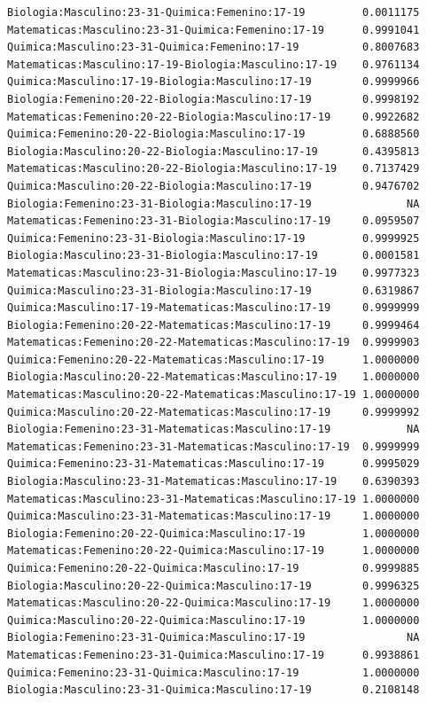 \documentclass{rapport}
\begin{document}
\begin{itemize}
\begin{verbatim}
Biologia:Masculino:23-31-Quimica:Femenino:17-19         0.0011175
Matematicas:Masculino:23-31-Quimica:Femenino:17-19      0.9991041
Quimica:Masculino:23-31-Quimica:Femenino:17-19          0.8007683
Matematicas:Masculino:17-19-Biologia:Masculino:17-19    0.9761134
Quimica:Masculino:17-19-Biologia:Masculino:17-19        0.9999966
Biologia:Femenino:20-22-Biologia:Masculino:17-19        0.9998192
Matematicas:Femenino:20-22-Biologia:Masculino:17-19     0.9922682
Quimica:Femenino:20-22-Biologia:Masculino:17-19         0.6888560
Biologia:Masculino:20-22-Biologia:Masculino:17-19       0.4395813
Matematicas:Masculino:20-22-Biologia:Masculino:17-19    0.7137429
Quimica:Masculino:20-22-Biologia:Masculino:17-19        0.9476702
Biologia:Femenino:23-31-Biologia:Masculino:17-19               NA
Matematicas:Femenino:23-31-Biologia:Masculino:17-19     0.0959507
Quimica:Femenino:23-31-Biologia:Masculino:17-19         0.9999925
Biologia:Masculino:23-31-Biologia:Masculino:17-19       0.0001581
Matematicas:Masculino:23-31-Biologia:Masculino:17-19    0.9977323
Quimica:Masculino:23-31-Biologia:Masculino:17-19        0.6319867
Quimica:Masculino:17-19-Matematicas:Masculino:17-19     0.9999999
Biologia:Femenino:20-22-Matematicas:Masculino:17-19     0.9999464
Matematicas:Femenino:20-22-Matematicas:Masculino:17-19  0.9999903
Quimica:Femenino:20-22-Matematicas:Masculino:17-19      1.0000000
Biologia:Masculino:20-22-Matematicas:Masculino:17-19    1.0000000
Matematicas:Masculino:20-22-Matematicas:Masculino:17-19 1.0000000
Quimica:Masculino:20-22-Matematicas:Masculino:17-19     0.9999992
Biologia:Femenino:23-31-Matematicas:Masculino:17-19            NA
Matematicas:Femenino:23-31-Matematicas:Masculino:17-19  0.9999999
Quimica:Femenino:23-31-Matematicas:Masculino:17-19      0.9995029
Biologia:Masculino:23-31-Matematicas:Masculino:17-19    0.6390393
Matematicas:Masculino:23-31-Matematicas:Masculino:17-19 1.0000000
Quimica:Masculino:23-31-Matematicas:Masculino:17-19     1.0000000
Biologia:Femenino:20-22-Quimica:Masculino:17-19         1.0000000
Matematicas:Femenino:20-22-Quimica:Masculino:17-19      1.0000000
Quimica:Femenino:20-22-Quimica:Masculino:17-19          0.9999885
Biologia:Masculino:20-22-Quimica:Masculino:17-19        0.9996325
Matematicas:Masculino:20-22-Quimica:Masculino:17-19     1.0000000
Quimica:Masculino:20-22-Quimica:Masculino:17-19         1.0000000
Biologia:Femenino:23-31-Quimica:Masculino:17-19                NA
Matematicas:Femenino:23-31-Quimica:Masculino:17-19      0.9938861
Quimica:Femenino:23-31-Quimica:Masculino:17-19          1.0000000
Biologia:Masculino:23-31-Quimica:Masculino:17-19        0.2108148

\end{verbatim}
\end{itemize}
\end{document}
